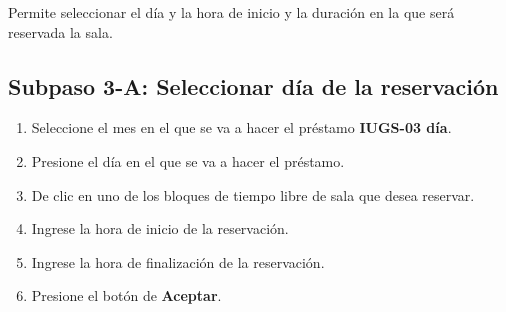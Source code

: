 Permite seleccionar el día y la hora de inicio y la duración en la que será reservada la sala.

\subsection{Subpaso 3-A: Seleccionar día de la reservación}
\begin{enumerate}
	\item Seleccione el mes en el que se va a hacer el préstamo 
		\textbf{IUGS-03 día}.
	\item Presione el día en el que se va a hacer el préstamo.
	\item De clic en uno de los bloques de tiempo libre de sala que 
		desea reservar.
	\item Ingrese la hora de inicio de la reservación.
	\item Ingrese la hora de finalización de la reservación.
	\item Presione el botón de \textbf{Aceptar}.
\end{enumerate}

